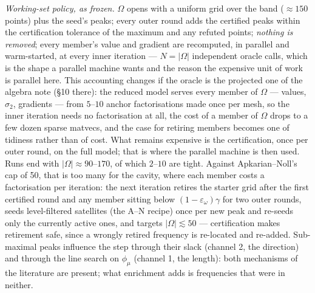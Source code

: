 \documentclass[11pt,a4paper]{article}
\newcommand{\eps}{\varepsilon}
\newcommand{\reve}[1]{#1}
\begin{document}
\emph{Working-set policy, as frozen.}  $\Omega$ opens with a uniform grid over the band
($\approx150$ points) plus the seed's peaks; every outer round adds the certified peaks
within the certification tolerance of the maximum and any refuted points; \emph{nothing
is removed}; every member's value and gradient are recomputed, in parallel and
warm-started, at every inner iteration --- $N=|\Omega|$ independent oracle calls, which
is the shape a parallel machine wants and the reason the expensive unit of work is
parallel here.  \reve{This accounting changes if the oracle is the projected one of the
algebra note (\S10 there): the reduced model serves every member of
$\Omega$ --- values, $\sigma_2$, gradients --- from $5$--$10$ anchor factorisations made
once per mesh, so the inner iteration needs no factorisation at all, the cost of a
member of $\Omega$ drops to a few dozen sparse matvecs, and the case for retiring
members becomes one of tidiness rather than of cost.  What remains expensive is the
certification, once per outer round, on the full model; that is where the parallel
machine is then used.}  Runs end with $|\Omega|\approx90$--$170$, of which $2$--$10$ are tight.
Against Apkarian--Noll's cap of 50, that is too many for the cavity, where each member
costs a factorisation per iteration: the next iteration retires the starter grid after
the first certified round and any member sitting below $(1-\eps_\omega)\gamma$ for two
outer rounds, seeds level-filtered satellites (the A--N recipe) once per new peak and
re-seeds only the currently active ones, and targets $|\Omega|\lesssim50$ ---
certification makes retirement safe, since a wrongly retired frequency is re-located and
re-added.  Sub-maximal peaks influence the step through their slack (channel 2, the
direction) and through the line search on $\phi_\mu$ (channel 1, the length): both
mechanisms of the literature are present; what enrichment adds is frequencies that were in
neither.
\end{document}
